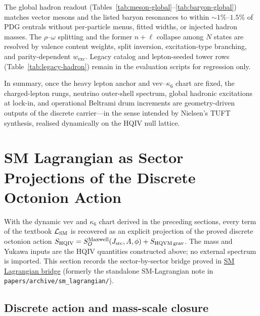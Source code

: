 \documentclass[11pt]{amsart}
\begin{document}
The global hadron readout (Tables~\ref{tab:meson-global}--\ref{tab:baryon-global}) matches vector mesons and the listed baryon resonances to within $\sim 1\%$--$1.5\%$ of PDG centrals without per-particle menus, fitted widths, or injected hadron masses. The $\rho$--$\omega$ splitting and the former $n+\ell$ collapse among $N$ states are resolved by valence content weights, split inversion, excitation-type branching, and parity-dependent $w_{\mathrm{exc}}$. Legacy catalog and lepton-seeded tower rows (Table~\ref{tab:legacy-hadron}) remain in the evaluation scripts for regression only.

In summary, once the heavy lepton anchor and vev--$\kappa_6$ chart are fixed, the charged-lepton rungs, neutrino outer-shell spectrum, global hadronic excitations at lock-in, and operational Beltrami drum increments are geometry-driven outputs of the discrete carrier---in the sense intended by Nielsen's TUFT synthesis, realised dynamically on the HQIV null lattice.

\section{SM Lagrangian as Sector Projections of the Discrete Octonion Action}

With the dynamic vev and $\kappa_6$ chart derived in the preceding sections, every term of the textbook $\mathcal{L}_{\rm SM}$ \cite{pdg2024,peskin1995,schwartz2014} is recovered as an explicit projection of the proved discrete octonion action $S_{\rm HQIV} = S_O^{\rm Maxwell}(J_{\rm src},A,\phi) + S_{\rm HQVM\,grav}$. The mass and Yukawa inputs are the HQIV quantities constructed above; no external spectrum is imported. This section records the sector-by-sector bridge proved in \hyperref[lean:sm-lagrangian-bridge]{SM Lagrangian bridge} (formerly the standalone SM-Lagrangian note in \nolinkurl{papers/archive/sm_lagrangian/}).

\subsection{Discrete action and mass-scale closure}
\label{subsec:sm-inputs}
\end{document}

